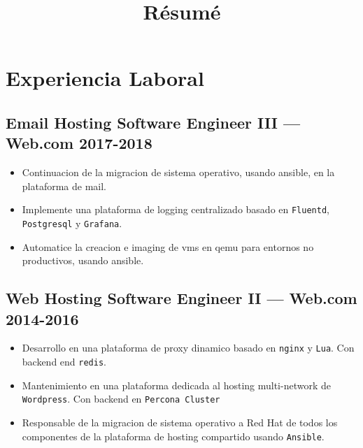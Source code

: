 \documentclass[11pt]{article}
\begin{document}
\title{R\'esum\'e}
\author{\FULLNAME}



\section{Experiencia Laboral}


\subsection{Email Hosting Software Engineer III --- Web.com \hfill 2017-2018}
\begin{itemize}
\item Continuacion de la migracion de sistema operativo, usando ansible, en la plataforma de mail.
\item Implemente una plataforma de logging centralizado basado en \texttt{Fluentd}, \texttt{Postgresql} y \texttt{Grafana}.
\item Automatice la creacion e imaging de vms en qemu para entornos no productivos, usando ansible.
\end{itemize}

\subsection{Web Hosting Software Engineer II --- Web.com \hfill 2014-2016}
\begin{itemize}
\item Desarrollo en una plataforma de proxy dinamico basado en \texttt{nginx} y \texttt{Lua}. Con backend end \texttt{redis}.
\item Mantenimiento en una plataforma dedicada al hosting multi-network de \texttt{Wordpress}. Con backend en \texttt{Percona Cluster}
\item Responsable de la migracion de sistema operativo a Red Hat de todos los componentes de la plataforma de hosting compartido usando \texttt{Ansible}.

\end{itemize}
\end{document}

